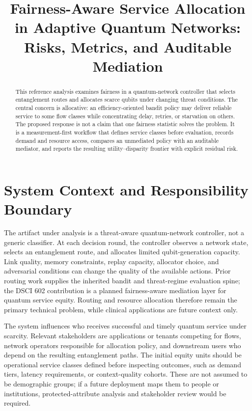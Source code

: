 \documentclass[10pt,conference]{IEEEtran}
\title{Fairness-Aware Service Allocation in Adaptive Quantum Networks:\\
Risks, Metrics, and Auditable Mediation}
\author{\IEEEauthorblockN{Piter Garcia}
\IEEEauthorblockA{DSCI 602: Applied Data Science II\\
Focus Area: Fairness\\
Capstone: Fairness-Aware Adaptive Routing for Quantum Networks}}
\begin{document}
\maketitle

\begin{abstract}
This reference analysis examines fairness in a quantum-network controller that
selects entanglement routes and allocates scarce qubits under changing threat
conditions. The central concern is allocative: an efficiency-oriented bandit
policy may deliver reliable service to some flow classes while concentrating
delay, retries, or starvation on others. The proposed response is not a claim
that one fairness statistic solves the problem. It is a measurement-first
workflow that defines service classes before evaluation, records demand and
resource access, compares an unmediated policy with an auditable mediator, and
reports the resulting utility--disparity frontier with explicit residual risk.
\end{abstract}

\section{System Context and Responsibility Boundary}
The artifact under analysis is a threat-aware quantum-network controller, not a
generic classifier. At each decision round, the controller observes a network
state, selects an entanglement route, and allocates limited qubit-generation
capacity. Link quality, memory constraints, replay capacity, allocator choice,
and adversarial conditions can change the quality of the available actions.
Prior routing work supplies the inherited bandit and threat-regime evaluation
spine; the DSCI 602 contribution is a planned fairness-aware mediation layer
for quantum service equity. Routing and resource allocation therefore remain
the primary technical problem, while clinical applications are future context
only.

The system influences who receives successful and timely quantum service under
scarcity. Relevant stakeholders are applications or tenants competing for
flows, network operators responsible for allocation policy, and downstream
users who depend on the resulting entanglement paths. The initial equity units
should be operational service classes defined before inspecting outcomes, such
as demand tiers, latency requirements, or context-quality cohorts. These are
not assumed to be demographic groups; if a future deployment maps them to
people or institutions, protected-attribute analysis and stakeholder review
would be required.
\end{document}
